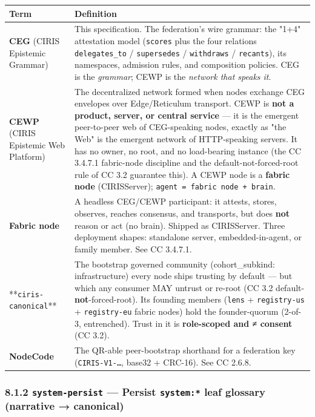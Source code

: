 \documentclass[11pt]{article}
\begin{document}
{\footnotesize
\begin{longtable}{|p{8.0cm}|p{8.0cm}|}\hline
\textbf{Term} & \textbf{Definition} \\ \hline\endhead
\textbf{CEG} (CIRIS Epistemic Grammar) & This specification. The federation's wire grammar: the "1+4" attestation model (\texttt{scores} plus the four relations \texttt{delegates\_to} / \texttt{supersedes} / \texttt{withdraws} / \texttt{recants}), its namespaces, admission rules, and composition policies. CEG is the \textit{grammar}; CEWP is the \textit{network that speaks it}. \\ \hline
\textbf{CEWP} (CIRIS Epistemic Web Platform) & The decentralized network formed when nodes exchange CEG envelopes over Edge/Reticulum transport. CEWP is \textbf{not a product, server, or central service} — it is the emergent peer-to-peer web of CEG-speaking nodes, exactly as "the Web" is the emergent network of HTTP-speaking servers. It has no owner, no root, and no load-bearing instance (the CC 3.4.7.1 fabric-node discipline and the default-not-forced-root rule of CC 3.2 guarantee this). A CEWP node is a \textbf{fabric node} (CIRISServer); \texttt{agent = fabric node + brain}. \\ \hline
\textbf{Fabric node} & A headless CEG/CEWP participant: it attests, stores, observes, reaches consensus, and transports, but does \textbf{not} reason or act (no brain). Shipped as CIRISServer. Three deployment shapes: standalone server, embedded-in-agent, or family member. See CC 3.4.7.1. \\ \hline
**\texttt{ciris-canonical}** & The bootstrap governed community (cohort\_subkind: infrastructure) every node ships trusting by default — but which any consumer MAY untrust or re-root (CC 3.2 default-\textbf{not}-forced-root). Its founding members (\texttt{lens} + \texttt{registry-us} + \texttt{registry-eu} fabric nodes) hold the founder-quorum (2-of-3, entrenched). Trust in it is \textbf{role-scoped and ≠ consent} (CC 3.2). \\ \hline
\textbf{NodeCode} & The QR-able peer-bootstrap shorthand for a federation key (\texttt{CIRIS-V1-…}, base32 + CRC-16). See CC 2.6.8. \\ \hline
\end{longtable}}


\subsubsection*{8.1.2 \texttt{system-persist} — Persist \texttt{system:*} leaf glossary (narrative → canonical)}
\end{document}
